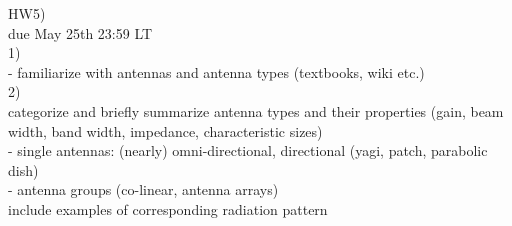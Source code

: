 \begin{taskspec}

HW5)\\

due May 25th 23:59 LT\\

1)\\
- familiarize with antennas and antenna types (textbooks, wiki etc.)\\

2)\\
categorize and briefly summarize antenna types and their properties (gain, beam width, band width, impedance, characteristic sizes)\\

- single antennas: (nearly) omni-directional, directional (yagi, patch, parabolic dish)\\

- antenna groups (co-linear, antenna arrays)\\

include examples of corresponding radiation pattern\\
\end{taskspec}
